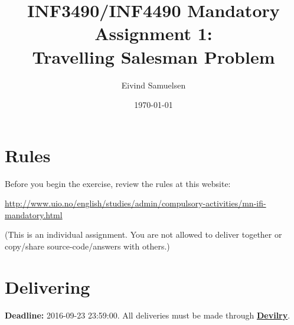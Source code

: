 
\title{\vspace{-2cm}INF3490/INF4490 Mandatory Assignment 1:\\
Travelling Salesman Problem}
\author{Eivind Samuelsen}
\date{\today}



    \renewcommand\marginsymbol[1][0pt]{%
  \tabto*{0cm}\makebox[-1cm][c]{$\mathbb{P}$}\tabto*{\TabPrevPos}}

\maketitle
\section*{Rules}
Before you begin the exercise, review the rules at this website:
\begin{center}
\url{http://www.uio.no/english/studies/admin/compulsory-activities/mn-ifi-mandatory.html}
\end{center}
(This is an individual assignment.
You are not allowed to deliver together or copy/share source-code/answers with others.)

\section*{Delivering}
\textbf{Deadline:} 2016-09-23 23:59:00. All deliveries must be made through
\href{https://devilry.ifi.uio.no}{\textbf{Devilry}}.
